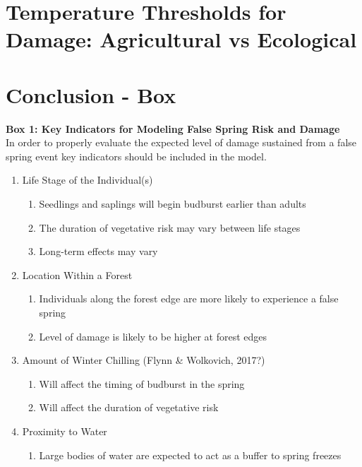 \documentclass{article}\usepackage[]{graphicx}\usepackage[]{color}
\begin{document}
\section*{Temperature Thresholds for Damage: Agricultural vs Ecological}

\section*{Conclusion - Box}
\captionsetup[table]{textformat=empty,labelformat=empty}
\begin{siderules}
\textbf {Box 1: Key Indicators for Modeling False Spring Risk and Damage}\\
In order to properly evaluate the expected level of damage sustained from a false spring event
key indicators should be included in the model.
\renewcommand{\theenumi}{\Roman{enumi}}
\renewcommand{\theenumii}{\roman{enumii}}
\begin{enumerate}
  \item Life Stage of the Individual(s) \citep{Caffarra2011}
  \begin{enumerate}
    \item Seedlings and saplings will begin budburst earlier than adults
    \item The duration of vegetative risk may vary between life stages
    \item Long-term effects may vary
  \end{enumerate}
  \item Location Within a Forest \citep{Augspurger2013}
  \begin{enumerate}
    \item Individuals along the forest edge are more likely to experience a false spring
    \item Level of damage is likely to be higher at forest edges
  \end{enumerate}
  \item Amount of Winter Chilling (Flynn \& Wolkovich, 2017?)
  \begin{enumerate}
    \item Will affect the timing of budburst in the spring
    \item Will affect the duration of vegetative risk
  \end{enumerate}
  \item Proximity to Water %
  \begin{enumerate}
    \item Large bodies of water are expected to act as a buffer to spring freezes

\end{enumerate}
\end{enumerate}
\end{siderules}
\end{document}
